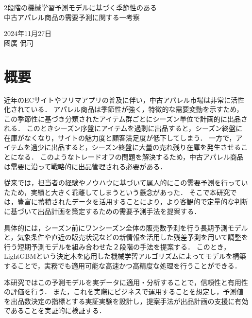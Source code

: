 \documentclass[dvipdfmx]{jreport}
\begin{document}
\begin{center}{
        \Large{2段階の機械学習予測モデルに基づく季節性のある\\中古アパレル商品の需要予測に関する一考察}
}
\end{center}

\begin{flushright}
    2024年11月27日\\
    國廣 侃司
\end{flushright}


\section{概要}
近年のECサイトやフリマアプリの普及に伴い，中古アパレル市場は非常に活性化されている．
アパレル商品は季節性が強く，特徴的な需要変動を示すため，この季節性に基づき分類されたアイテム群ごとにシーズン単位で計画的に出品される．
このときシーズン序盤にアイテムを過剰に出品すると，シーズン終盤に在庫がなくなり，サイトの魅力度と顧客満足度が低下してしまう．
一方で，アイテムを過少に出品すると，シーズン終盤に大量の売れ残り在庫を発生させることになる．
このようなトレードオフの問題を解決するため，中古アパレル商品は需要に沿って戦略的に出品管理される必要がある．

従来では，担当者の経験やノウハウに基づいて属人的にこの需要予測を行っていたため，実績と大きく乖離してしまうという懸念があった．
そこで本研究では，豊富に蓄積されたデータを活用することにより，より客観的で定量的な判断に基づいて出品計画を策定するための需要予測手法を提案する．

具体的には，シーズン前にワンシーズン全体の販売数予測を行う長期予測モデルと，気象条件や直近の販売状況などの新情報を活用した残差予測を用いて調整を行う短期予測モデルを組み合わせた２段階の手法を提案する．
このとき，LightGBMという決定木を応用した機械学習アルゴリズムによってモデルを構築することで，実務でも適用可能な高速かつ高精度な処理を行うことができる．

本研究ではこの予測モデルを実データに適用・分析することで，信頼性と有用性の評価を行う．
また，これを実際にビジネスで運用することを想定し，予測値を出品数決定の指標とする実証実験を設計し，提案手法が出品計画の支援に有効であることを実証的に検証する．
\end{document}
